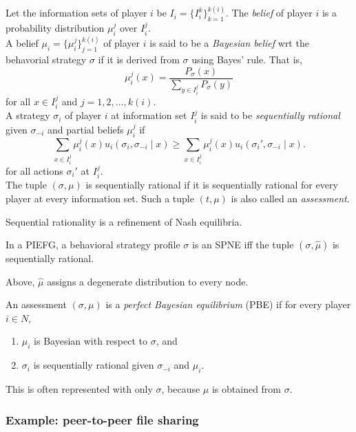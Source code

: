 		\begin{fdef}
			Let the information sets of player $i$ be $I_i = \{ I_i^k \}_{k=1}^{k(i)}$. The \emph{belief} of player $i$ is a probability distribution $\mu_i^j$ over $I_i^j$.\\
			A belief $\mu_i = \{\mu_i^j\}_{j=1}^{k(i)}$ of player $i$ is said to be a \emph{Bayesian belief} wrt the behavorial strategy $\sigma$ if it is derived from $\sigma$ using Bayes' rule. That is,
			\[ \mu_i^j(x) = \frac{P_\sigma(x)}{\sum_{y \in I_i^j} P_\sigma(y)} \]
			for all $x \in I_i^j$ and $j = 1,2,\ldots,k(i)$.\\
			A strategy $\sigma_i$ of player $i$ at information set $I_i^j$ is said to be \emph{sequentially rational} given $\sigma_{-i}$ and partial beliefs $\mu_i^j$ if
			\[ \sum_{x \in I_i^j} \mu_i^j(x) u_i(\sigma_i,\sigma_{-i} \mid x) \ge \sum_{x \in I_i^j} \mu_i^j(x) u_i(\sigma_i',\sigma_{-i} \mid x). \]
			for all actions $\sigma_i'$ at $I_i^j$.\\
			The tuple $(\sigma,\mu)$ is sequentially rational if it is sequentially rational for every player at every information set. Such a tuple $(t,\mu)$ is also called an \emph{assessment}.
		\end{fdef}

		Sequential rationality is a refinement of Nash equilibria.

		\begin{fprop}
			In a PIEFG, a behavioral strategy profile $\sigma$ is an SPNE iff the tuple $(\sigma,\hat{\mu})$ is sequentially rational.
		\end{fprop}
		Above, $\hat{\mu}$ assigns a degenerate distribution to every node.

		\begin{fdef}
			An assessment $(\sigma,\mu)$ is a \emph{perfect Bayesian equilibrium} (PBE) if for every player $i \in N$,
			\begin{enumerate}
				\item $\mu_i$ is Bayesian with respect to $\sigma$, and
				\item $\sigma_i$ is sequentially rational given $\sigma_{-i}$ and $\mu_i$.
			\end{enumerate}
		\end{fdef}
		This is often represented with only $\sigma$, because $\mu$ is obtained from $\sigma$.

	\subsubsection{Example: peer-to-peer file sharing}

